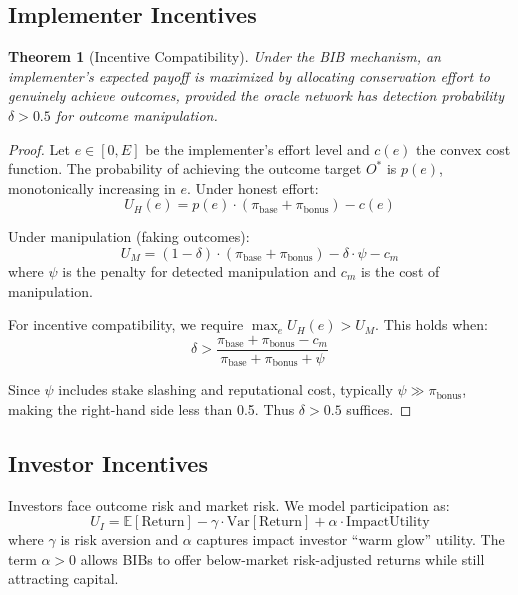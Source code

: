 \documentclass[11pt,a4paper]{article}
\newtheorem{theorem}{Theorem}
\newcommand{\E}{\mathbb{E}}
\begin{document}
\subsection{Implementer Incentives}

\begin{theorem}[Incentive Compatibility]
Under the BIB mechanism, an implementer's expected payoff is maximized
by allocating conservation effort to genuinely achieve outcomes, provided
the oracle network has detection probability $\delta > 0.5$ for outcome
manipulation.
\end{theorem}

\begin{proof}
Let $e \in [0, E]$ be the implementer's effort level and $c(e)$ the
convex cost function. The probability of achieving the outcome target
$O^*$ is $p(e)$, monotonically increasing in $e$. Under honest effort:
\begin{equation}
  U_H(e) = p(e) \cdot (\pi_{\text{base}} + \pi_{\text{bonus}}) - c(e)
\end{equation}

Under manipulation (faking outcomes):
\begin{equation}
  U_M = (1 - \delta) \cdot (\pi_{\text{base}} + \pi_{\text{bonus}})
  - \delta \cdot \psi - c_m
\end{equation}
where $\psi$ is the penalty for detected manipulation and $c_m$ is the
cost of manipulation.

For incentive compatibility, we require $\max_e U_H(e) > U_M$. This
holds when:
\begin{equation}
  \delta > \frac{\pi_{\text{base}} + \pi_{\text{bonus}} - c_m}
  {\pi_{\text{base}} + \pi_{\text{bonus}} + \psi}
\end{equation}

Since $\psi$ includes stake slashing and reputational cost, typically
$\psi \gg \pi_{\text{bonus}}$, making the right-hand side less than
0.5. Thus $\delta > 0.5$ suffices.
\end{proof}

\subsection{Investor Incentives}

Investors face outcome risk and market risk. We model participation as:
\begin{equation}
  U_I = \E[\text{Return}] - \gamma \cdot \text{Var}[\text{Return}]
  + \alpha \cdot \text{ImpactUtility}
\end{equation}
where $\gamma$ is risk aversion and $\alpha$ captures impact investor
``warm glow'' utility. The term $\alpha > 0$ allows BIBs to offer
below-market risk-adjusted returns while still attracting capital.
\end{document}
